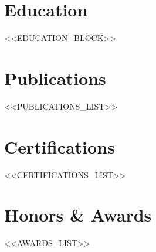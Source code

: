 \documentclass[letterpaper,11pt]{article}
\newcommand{\resumeSubHeadingListStart}{\begin{itemize}[leftmargin=0.15in, label={}]}
\newcommand{\resumeSubHeadingListEnd}{\end{itemize}}
\begin{document}
\newpage

\section{Education}
  \resumeSubHeadingListStart
    <<EDUCATION_BLOCK>>
  \resumeSubHeadingListEnd

\section{Publications}
  \begin{itemize}[leftmargin=0.15in, label={}, itemsep=1pt]
    <<PUBLICATIONS_LIST>>
  \end{itemize}

\section{Certifications}
  \begin{itemize}[leftmargin=0.15in, label={}, itemsep=1pt]
    <<CERTIFICATIONS_LIST>>
  \end{itemize}

\section{Honors \& Awards}
  \begin{itemize}[leftmargin=0.15in, label={}, itemsep=1pt]
    <<AWARDS_LIST>>
  \end{itemize}
\end{document}
